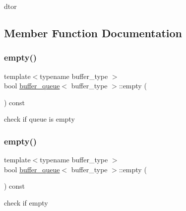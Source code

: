 dtor 



\subsection{Member Function Documentation}
\mbox{\label{structbuffer__queue_a5d618b9b6dd1f700db6f96182cc1ad15}} 
\subsubsection{\texorpdfstring{empty()}{empty()}\hspace{0.1cm}{\footnotesize\ttfamily [1/2]}}
{\footnotesize\ttfamily template$<$typename buffer\+\_\+type $>$ \\
bool \hyperlink{structbuffer__queue}{buffer\+\_\+queue}$<$ buffer\+\_\+type $>$\+::empty (\begin{DoxyParamCaption}{ }\end{DoxyParamCaption}) const\hspace{0.3cm}{\ttfamily [inline]}}



check if queue is empty 

\mbox{\label{structbuffer__queue_a5d618b9b6dd1f700db6f96182cc1ad15}} 
\subsubsection{\texorpdfstring{empty()}{empty()}\hspace{0.1cm}{\footnotesize\ttfamily [2/2]}}
{\footnotesize\ttfamily template$<$typename buffer\+\_\+type $>$ \\
bool \hyperlink{structbuffer__queue}{buffer\+\_\+queue}$<$ buffer\+\_\+type $>$\+::empty (\begin{DoxyParamCaption}{ }\end{DoxyParamCaption}) const\hspace{0.3cm}{\ttfamily [inline]}}



check if empty 

\mbox{\label{structbuffer__queue_ab26cbb480e9a300a4a021f4be1bb2735}} 
